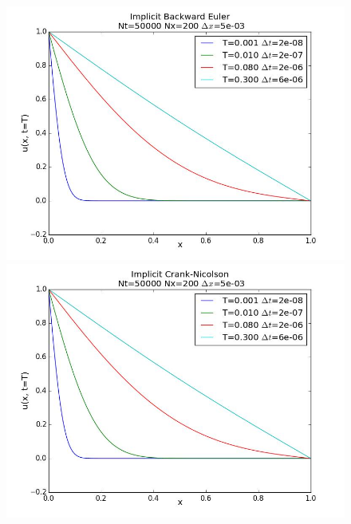 \documentclass[12pt]{article}
\begin{document}
\begin{flushleft}
\begin{figure}[!h]
  \begin{minipage}{\linewidth}
    \centering
    {\includegraphics[scale=0.27]{EB_Nt5000_Nx200}}
     {\includegraphics[scale=0.27]{CN_Nt5000_Nx200}}
  \end{minipage}\\


\end{figure}
\end{flushleft}
\end{document}
